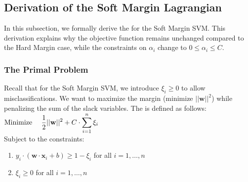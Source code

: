 \subsection*{Derivation of the Soft Margin Lagrangian}
\label{subsec:soft-margin-derivation}

In this subsection, we formally derive the  for the Soft Margin SVM. This derivation explains why the objective function remains unchanged compared to the Hard Margin case, while the constraints on $\alpha_i$ change to $0 \leq \alpha_i \leq C$.

\subsubsection{The Primal Problem}
Recall that for the Soft Margin SVM, we introduce  $\xi_i \geq 0$ to allow misclassifications. We want to maximize the margin (minimize $||\mathbf{w}||^2$) while penalizing the sum of the slack variables.
The  is defined as follows:
\\[0.2cm]
\hspace*{1.3cm}
$\displaystyle \text{Minimize } \quad \frac{1}{2} ||\mathbf{w}||^2 + C \cdot\sum_{i=1}^n \xi_i$
\\[0.2cm]
Subject to the constraints:
\begin{enumerate}
    \item $y_i \cdot(\mathbf{w} \cdot \mathbf{x}_i + b) \geq 1 - \xi_i$ \quad for all $i=1, \dots, n$
    \item $\xi_i \geq 0$ \quad for all $i=1, \dots, n$
\end{enumerate}

